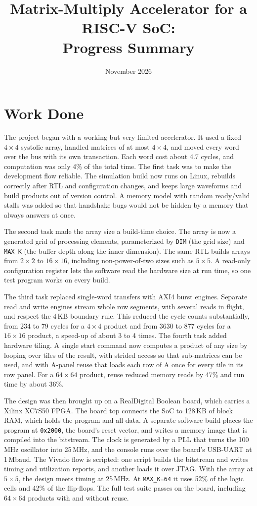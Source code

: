 \documentclass[10.5pt,a4paper]{article}
\title{\vspace{-1.5em}\textbf{Matrix-Multiply Accelerator for a RISC-V SoC:}\\
\large Progress Summary}
\author{}
\date{November 2026}
\begin{document}
\maketitle
\vspace{-1.2em}

\section{Work Done}

The project began with a working but very limited accelerator. It used a fixed $4\times 4$
systolic array, handled matrices of at most $4\times 4$, and moved every word over the bus
with its own transaction. Each word cost about 4.7 cycles, and computation was only 4\% of
the total time. The first task was to make the development flow reliable. The simulation
build now runs on Linux, rebuilds correctly after RTL and configuration changes, and keeps
large waveforms and build products out of version control. A memory model with random
ready/valid stalls was added so that handshake bugs would not be hidden by a memory that
always answers at once.

The second task made the array size a build-time choice. The array is now a generated grid
of processing elements, parameterized by \texttt{DIM} (the grid size) and \texttt{MAX\_K}
(the buffer depth along the inner dimension). The same RTL builds arrays from $2\times 2$ to
$16\times 16$, including non-power-of-two sizes such as $5\times 5$. A read-only configuration
register lets the software read the hardware size at run time, so one test program works on
every build.

The third task replaced single-word transfers with AXI4 burst engines. Separate read and
write engines stream whole row segments, with several reads in flight, and respect the
4\,KB boundary rule. This reduced the cycle counts substantially, from 234 to 79 cycles for a
$4\times 4$ product and from 3630 to 877 cycles for a $16\times 16$ product, a speed-up of
about 3 to 4 times. The fourth task added hardware tiling. A single start command now computes
a product of any size by looping over tiles of the result, with strided access so that
sub-matrices can be used, and with A-panel reuse that loads each row of A once for every
tile in its row panel. For a $64\times 64$ product, reuse reduced memory reads by 47\% and
run time by about 36\%.

The design was then brought up on a RealDigital Boolean board, which carries a Xilinx
XC7S50 FPGA. The board top connects the SoC to 128\,KB of block RAM, which holds the
program and all data. A separate software build places the program at \texttt{0x2000}, the
board's reset vector, and writes a memory image that is compiled into the bitstream. The
clock is generated by a PLL that turns the 100\,MHz oscillator into 25\,MHz, and the console
runs over the board's USB-UART at 1\,Mbaud. The Vivado flow is scripted: one script builds
the bitstream and writes timing and utilization reports, and another loads it over JTAG.
With the array at $5\times 5$, the design meets timing at 25\,MHz. At \texttt{MAX\_K=64} it
uses 52\% of the logic cells and 42\% of the flip-flops. The full test suite passes on the
board, including $64\times 64$ products with and without reuse.
\end{document}
